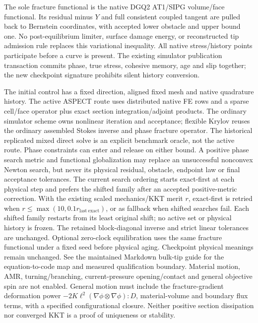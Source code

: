 \documentclass[11pt]{article}
\begin{document}
The sole fracture functional is the native DGQ2 AT1/SIPG volume/face functional.
Its residual minus $Y$ and full consistent coupled tangent are pulled back to
Bernstein coordinates, with accepted lower obstacle and upper bound one.
No post-equilibrium limiter, surface damage energy, or reconstructed tip
admission rule replaces this variational inequality. All native stress/history
points participate before a curve is present. The existing simulator publication
transaction commits phase, true stress, cohesive memory, age and slip together;
the new checkpoint signature prohibits silent history conversion.

The initial control has a fixed direction, aligned fixed mesh and native
quadrature history. The active ASPECT route uses distributed native FE rows and
a sparse cell/face operator plus exact section integration/adjoint products.
The ordinary simulator scheme owns nonlinear iteration and acceptance; flexible
Krylov reuses the ordinary assembled Stokes inverse and phase fracture operator.
The historical replicated mixed direct solve is an explicit benchmark oracle,
not the active route. Phase constraints can enter and release on either bound.
A positive phase search metric and functional globalization may replace an
unsuccessful nonconvex Newton search, but never its physical residual, obstacle,
endpoint law or final acceptance tolerances. The current search ordering starts
exact-first at each physical step and prefers the shifted family after an accepted
positive-metric correction. With the existing scaled mechanics/KKT merit $r$,
exact-first is retried when $r\le\max(10,0.1r_{\mathrm{last\ exact}})$, or as
fallback when shifted searches fail. Each shifted family restarts from its least
original shift; no active set or physical history is frozen. The retained
block-diagonal inverse and strict linear tolerances are unchanged. Optional zero-clock equilibration
uses the same fracture functional under a fixed seed before physical aging.
Checkpoint physical meanings remain unchanged. See the maintained Markdown
bulk-tip guide for the equation-to-code map and measured qualification boundary.
Material motion, AMR, turning/branching, current-pressure opening/contact and
general objective spin are not enabled. General motion must include the fracture-gradient deformation
power $-2K\ell^2(\nabla\phi\otimes\nabla\phi):D$, material-volume and boundary
flux terms, with a specified configurational closure. Neither positive
section dissipation nor converged KKT is a proof of uniqueness or stability.
\end{document}
